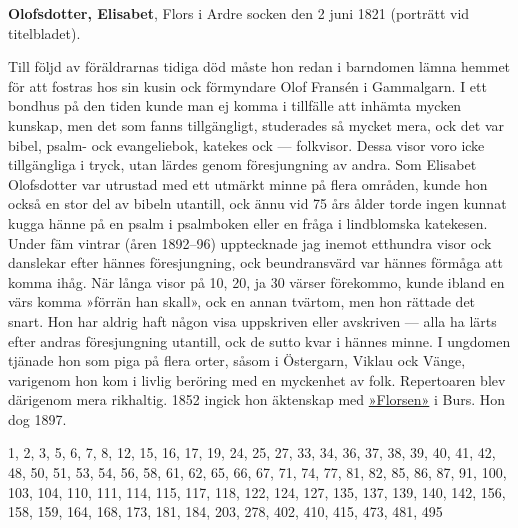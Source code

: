 \textbf{Olofsdotter, Elisabet}, Flors i Ardre socken den 2 juni 1821 (porträtt vid titelbladet).

Till följd av föräldrarnas tidiga död måste hon redan i barndomen lämna hemmet för att fostras hos sin kusin ock förmyndare Olof Fransén i Gammalgarn. I ett bondhus på den tiden kunde man ej komma i tillfälle att inhämta mycken kunskap, men det som fanns tillgängligt, studerades så mycket mera, ock det var bibel, psalm- ock evangeliebok, katekes ock --- folkvisor. Dessa visor voro icke tillgängliga i tryck, utan lärdes genom föresjungning av andra. Som Elisabet Olofsdotter var utrustad med ett utmärkt minne på flera områden, kunde hon också en stor del av bibeln utantill, ock ännu vid 75 års ålder torde ingen kunnat kugga hänne på en psalm i psalmboken eller en fråga i lindblomska katekesen. Under fäm vintrar (åren 1892--96) upptecknade jag inemot etthundra visor ock danslekar efter hännes föresjungning, ock beundransvärd var hännes förmåga att komma ihåg. När långa visor på 10, 20, ja 30 värser förekommo, kunde ibland en värs komma »förrän han skall», ock en annan tvärtom, men hon rättade det snart. Hon har aldrig haft någon visa uppskriven eller avskriven --- alla ha lärts efter andras föresjungning utantill, ock de sutto kvar i hännes minne. I ungdomen tjänade hon som piga på flera orter, såsom i Östergarn, Viklau ock Vänge, varigenom hon kom i livlig beröring med en myckenhet av folk. Repertoaren blev därigenom mera rikhaltig. 1852 ingick hon äktenskap med \href{Florsen}{»Florsen»} i Burs. Hon dog 1897. 

1, 2, 3, 5, 6, 7, 8, 12, 15, 16, 17, 19, 24, 25, 27, 33, 34, 36, 37, 38, 39, 40, 41, 42, 48, 50, 51, 53, 54, 56, 58, 61, 62, 65, 66, 67, 71, 74, 77, 81, 82, 85, 86, 87, 91, 100, 103, 104, 110, 111, 114, 115, 117, 118, 122, 124, 127, 135, 137, 139, 140, 142, 156, 158, 159, 164, 168, 173, 181, 184, 203, 278, 402, 410, 415, 473, 481, 495 
